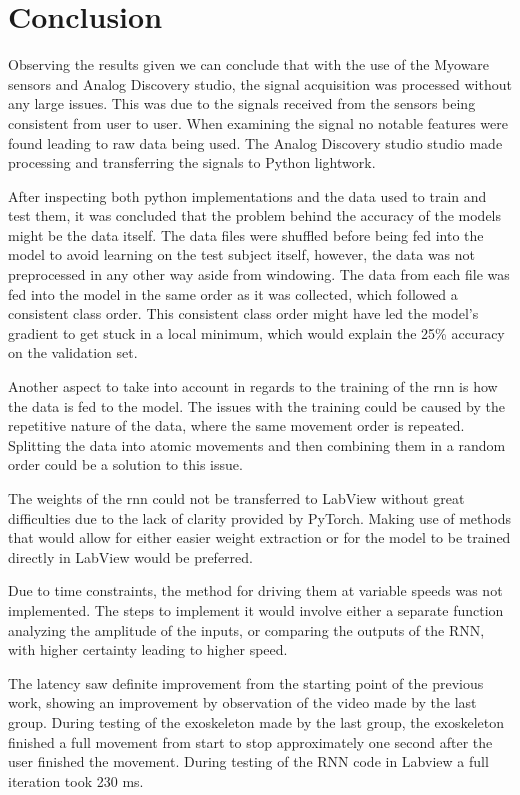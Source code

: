 \section{Conclusion}
Observing the results given we can conclude that with the use of the Myoware sensors and Analog Discovery studio, the signal 
acquisition was processed without any large issues. This was due to the signals received from the sensors being consistent 
from user to user. When examining the signal no notable features were found leading to raw data being used.
The Analog Discovery studio studio made processing and transferring the signals to Python lightwork.


After inspecting both python implementations and the data used to train and test them, it was concluded that the problem behind the accuracy
of the models might be the data itself. The data files were shuffled before being fed into the model to avoid learning on the test subject
itself, however, the data was not preprocessed in any other way aside from windowing. The data from each file was fed into the model in the 
same order as it was collected, which followed a consistent class order. This consistent class order might have led the model's gradient to 
get stuck in a local minimum, which would explain the 25\% accuracy on the validation set.


Another aspect to take into account in regards to the training of the \acrshort{rnn} is how the data is fed to the model. The issues
with the training could be caused by the repetitive nature of the data, where the same movement order is repeated. Splitting the data
into atomic movements and then combining them in a random order could be a solution to this issue.


The weights of the \acrshort{rnn} could not be transferred to LabView without great difficulties due to the lack of clarity provided by
PyTorch. Making use of methods that would allow for either easier weight extraction or for the model to be trained
directly in LabView would be preferred.


Due to time constraints, the method for driving them at variable speeds was not implemented. The steps to implement it
would involve either a separate function analyzing the amplitude of the inputs, or comparing the outputs of the RNN,
with higher certainty leading to higher speed.


The latency saw definite improvement from the starting point of the previous work, showing an improvement by observation of the video made by the last group. During testing of the exoskeleton made by the last group,
the exoskeleton finished a full movement from start to stop approximately one second after the user finished the movement. During testing of the RNN code in Labview a full iteration took 230 ms.


